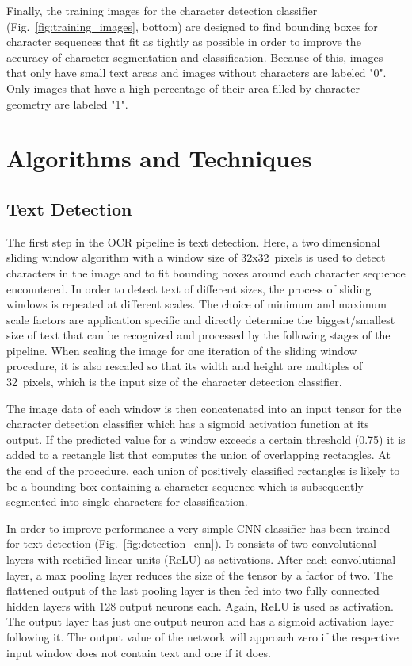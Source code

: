 \documentclass[12pt]{article}
\newcommand\figref[1]{Fig.~\ref{fig:#1}}
\begin{document}
Finally, the training images for the character detection classifier (\figref{training_images}, bottom) are
designed to find bounding boxes for character sequences that fit as tightly as possible in order to improve
the accuracy of character segmentation and classification.
%
Because of this, images that only have small
text areas and images without characters are labeled "0".
%
Only images that have a high percentage of their area filled by character geometry are labeled "1".

\section{Algorithms and Techniques}
\subsection{Text Detection}
The first step in the OCR pipeline is text detection.
%
Here, a two dimensional sliding window algorithm with a window size of 32x32~pixels is used to detect characters in the image and to fit bounding boxes
around each character sequence encountered.
%
In order to detect text of different sizes, the process of sliding windows is repeated at different
scales.
%
The choice of minimum and maximum scale factors are application specific and directly determine the
biggest/smallest size of text that can be recognized and processed by the following stages of the
pipeline.
%
When scaling the image for one iteration of the sliding window procedure, it is also rescaled
so that its width and height are multiples of 32~pixels, which is the input size of the character detection
classifier.

The image data of each window is then concatenated into an input tensor for the character detection
classifier which has a sigmoid activation function at its output.
%
If the predicted value for a window exceeds a certain threshold (0.75) it is added to a rectangle list that computes
the union of overlapping rectangles.
%
At the end of the procedure, each union of positively classified rectangles is likely to be a bounding
box containing a character sequence which is subsequently segmented into single characters for classification.

In order to improve performance a very simple CNN classifier has been trained for text detection (\figref{detection_cnn}).
It consists of two convolutional layers with rectified linear units (ReLU) as activations. After
each convolutional layer, a max pooling layer reduces the size of the tensor by a factor of two.
The flattened output of the last pooling layer is then fed into two fully connected hidden layers
with 128 output neurons each. Again, ReLU is used as activation. The output layer has just one
output neuron and has a sigmoid activation layer following it. The output value of the network
will approach zero if the respective input window does not contain text and one if it does.
\end{document}
